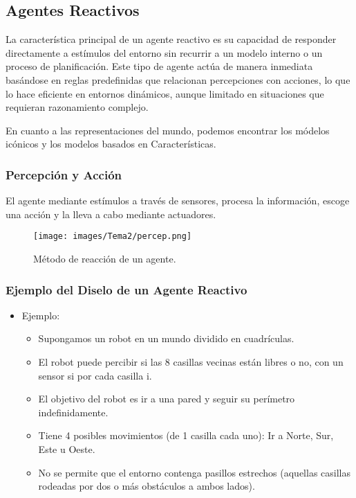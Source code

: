 \subsection{Agentes Reactivos}

La característica principal de un agente reactivo es
su capacidad de responder directamente a estímulos
del entorno sin recurrir a un modelo interno o un
proceso de planificación. Este tipo de agente actúa
de manera inmediata basándose en reglas
predefinidas que relacionan percepciones con
acciones, lo que lo hace eficiente en entornos
dinámicos, aunque limitado en situaciones que
requieran razonamiento complejo.

En cuanto a las representaciones del mundo, podemos encontrar los módelos icónicos y los modelos basados en Características.

\subsubsection{Percepción y Acción}

El agente mediante estímulos a través de sensores, procesa la información, escoge una acción y la lleva a cabo mediante actuadores.

\begin{figure}[H]
    \centering
    \texttt{[image: images/Tema2/percep.png]}
    \caption{Método de reacción de un agente.}
    \label{fig:agentes}
\end{figure}

\subsubsection*{Ejemplo del Diselo de un Agente Reactivo}
\begin{itemize}
    \item Ejemplo:
    \begin{itemize}
        \item Supongamos un robot en un mundo dividido en cuadrículas.
        \item El robot puede percibir si las 8 casillas vecinas están libres o no, con un sensor si por cada casilla i.
        \item El objetivo del robot es ir a una pared y seguir su perímetro indefinidamente.
        \item Tiene 4 posibles movimientos (de 1 casilla cada uno): Ir a Norte, Sur, Este u Oeste.
        \item No se permite que el entorno contenga pasillos estrechos (aquellas casillas rodeadas por dos o más obstáculos a ambos lados).
    \end{itemize}
\end{itemize}


